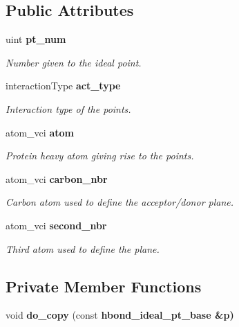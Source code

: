 \subsection*{Public Attributes}
\begin{CompactItemize}
\item 
uint \bf{pt\_\-num}\label{classSimSite3D_1_1hbond__ideal__pt__base_a6829823658e609726d64d46f05a53c4}

\begin{CompactList}\small\item\em Number given to the ideal point. \item\end{CompactList}\item 
interaction\-Type \bf{act\_\-type}\label{classSimSite3D_1_1hbond__ideal__pt__base_2b226c040314c92bf0e9d0e647f66897}

\begin{CompactList}\small\item\em Interaction type of the points. \item\end{CompactList}\item 
atom\_\-vci \bf{atom}\label{classSimSite3D_1_1hbond__ideal__pt__base_c69850f24c46ac0c32143cf6f3ac2c91}

\begin{CompactList}\small\item\em Protein heavy atom giving rise to the points. \item\end{CompactList}\item 
atom\_\-vci \bf{carbon\_\-nbr}\label{classSimSite3D_1_1hbond__ideal__pt__base_7155ffb9e0c06bc4267fb4ee28b9d212}

\begin{CompactList}\small\item\em Carbon atom used to define the acceptor/donor plane. \item\end{CompactList}\item 
atom\_\-vci \bf{second\_\-nbr}\label{classSimSite3D_1_1hbond__ideal__pt__base_733afddb617c0b55f4887e963d954848}

\begin{CompactList}\small\item\em Third atom used to define the plane. \item\end{CompactList}\end{CompactItemize}
\subsection*{Private Member Functions}
\begin{CompactItemize}
\item 
void \textbf{do\_\-copy} (const \bf{hbond\_\-ideal\_\-pt\_\-base} \&p)\label{classSimSite3D_1_1hbond__ideal__pt__base_ea14650cc4989d996bb228f2d68e2cee}

\end{CompactItemize}


